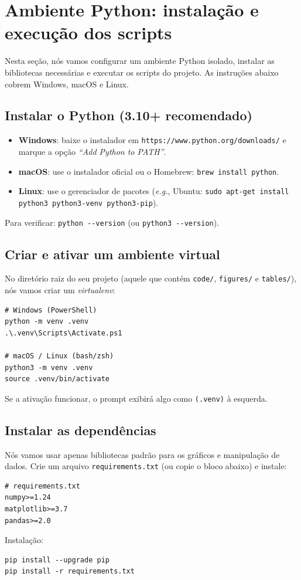 \documentclass[11pt,a4paper]{article}
\begin{document}
\section{Ambiente Python: instalação e execução dos scripts}

Nesta seção, nós vamos configurar um ambiente Python isolado, instalar as bibliotecas necessárias e executar os scripts do projeto. As instruções abaixo cobrem Windows, macOS e Linux.

\subsection{ Instalar o Python (3.10+ recomendado)}
\begin{itemize}
  \item \textbf{Windows}: baixe o instalador em \texttt{https://www.python.org/downloads/} e marque a opção \emph{“Add Python to PATH”}.
  \item \textbf{macOS}: use o instalador oficial ou o Homebrew: \verb|brew install python|.
  \item \textbf{Linux}: use o gerenciador de pacotes (\emph{e.g.}, Ubuntu: \verb|sudo apt-get install python3 python3-venv python3-pip|).
\end{itemize}
Para verificar: \verb|python --version| (ou \verb|python3 --version|).

\subsection{ Criar e ativar um ambiente virtual}
No diretório raiz do seu projeto (aquele que contém \texttt{code/}, \texttt{figures/} e \texttt{tables/}), nós vamos criar um \emph{virtualenv}:
\begin{verbatim}
# Windows (PowerShell)
python -m venv .venv
.\.venv\Scripts\Activate.ps1

# macOS / Linux (bash/zsh)
python3 -m venv .venv
source .venv/bin/activate
\end{verbatim}
Se a ativação funcionar, o prompt exibirá algo como \texttt{(.venv)} à esquerda.

\subsection{ Instalar as dependências}
Nós vamos usar apenas bibliotecas padrão para os gráficos e manipulação de dados. Crie um arquivo \texttt{requirements.txt} (ou copie o bloco abaixo) e instale:
\begin{verbatim}
# requirements.txt
numpy>=1.24
matplotlib>=3.7
pandas>=2.0
\end{verbatim}
Instalação:
\begin{verbatim}
pip install --upgrade pip
pip install -r requirements.txt
\end{verbatim}
\end{document}
